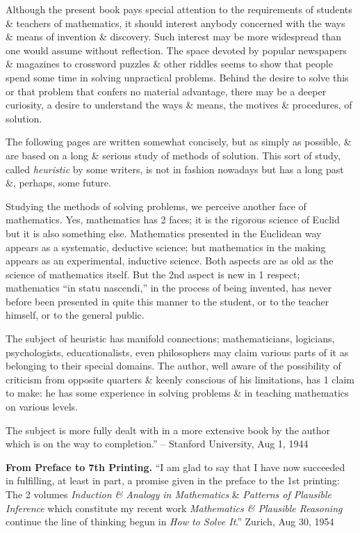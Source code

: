 \documentclass{article}
\begin{document}
\begin{enumerate}
	Although the present book pays special attention to the requirements of students \& teachers of mathematics, it should interest anybody concerned with the ways \& means of invention \& discovery. Such interest may be more widespread than one would assume without reflection. The space devoted by popular newspapers \& magazines to crossword puzzles \& other riddles seems to show that people spend some time in solving unpractical problems. Behind the desire to solve this or that problem that confers no material advantage, there may be a deeper curiosity, a desire to understand the ways \& means, the motives \& procedures, of solution.
	
	The following pages are written somewhat concisely, but as simply as possible, \& are based on a long \& serious study of methods of solution. This sort of study, called {\it heuristic} by some writers, is not in fashion nowadays but has a long past \&, perhaps, some future.
	
	Studying the methods of solving problems, we perceive another face of mathematics. Yes, mathematics has 2 faces; it is the rigorous science of {\sc Euclid} but it is also something else. Mathematics presented in the Euclidean way appears as a systematic, deductive science; but mathematics in the making appears as an experimental, inductive science. Both aspects are as old as the science of mathematics itself. But the 2nd aspect is new in 1 respect; mathematics ``in statu nascendi,'' in the process of being invented, has never before been presented in quite this manner to the student, or to the teacher himself, or to the general public.
	
	The subject of heuristic has manifold connections; mathematicians, logicians, psychologists, educationalists, even philosophers may claim various parts of it as belonging to their special domains. The author, well aware of the possibility of criticism from opposite quarters \& keenly conscious of his limitations, has 1 claim to make: he has some experience in solving problems \& in teaching mathematics on various levels.
	
	The subject is more fully dealt with in a more extensive book by the author which is on the way to completion.'' -- Stanford University, Aug 1, 1944
	
	{\bf From Preface to 7th Printing.} ``I am glad to say that I have now succeeded in fulfilling, at least in part, a promise given in the preface to the 1st printing: The 2 volumes {\it Induction \& Analogy in Mathematics} \& {\it Patterns of Plausible Inference} which constitute my recent work {\it Mathematics \& Plausible Reasoning} continue the line of thinking begun in {\it How to Solve It}.'' Zurich, Aug 30, 1954
	

\end{enumerate}
\end{document}
